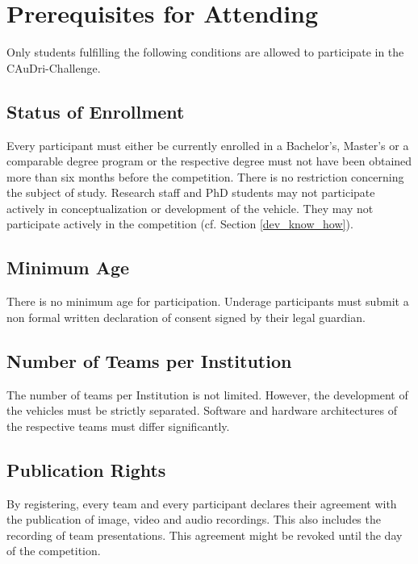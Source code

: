 \chapter{Prerequisites for Attending}

Only students fulfilling the following conditions are allowed to participate in
the CAuDri-Challenge.

\section{Status of Enrollment}

Every participant must either be currently enrolled in a Bachelor’s, Master’s
or a comparable degree program or the respective degree must not have been
obtained more than six months before the competition. There is no restriction
concerning the subject of study. Research staff and PhD students may not
participate actively in conceptualization or development of the vehicle. They
may not participate actively in the competition (cf. Section
\ref{dev_know_how}).


\section{Minimum Age}

There is no minimum age for participation. Underage participants must submit a
non formal written declaration of consent signed by their legal guardian.

\section{Number of Teams per Institution}

The number of teams per Institution is not limited. However, the development of
the vehicles must be strictly separated. Software and hardware architectures of
the respective teams must differ significantly.

\section{Publication Rights}

By registering, every team and every participant declares their agreement with
the publication of image, video and audio recordings. This also includes the
recording of team presentations. This agreement might be revoked until the day
of the competition.